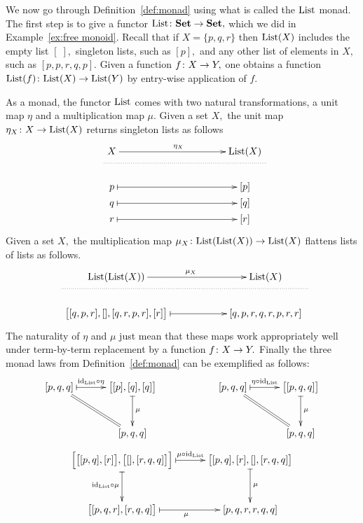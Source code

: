 \documentclass[CT4S-EN-RU]{subfiles}
\begin{document}
\begin{exampleENG}\label{ex:monad}
We now go through Definition~\ref{def:monad} using what is called the $\textnormal{List}$ monad. The first step is to give a functor $\textnormal{List}\colon{\mathbf{Set}}\rightarrow{\mathbf{Set}},$ which we did in Example~\ref{ex:free monoid}. Recall that if $X=\{p,q,r\}$ then $\textnormal{List}(X)$ includes the empty list $[\;],$ singleton lists, such as $[p],$ and any other list of elements in $X,$ such as $[p,p,r,q,p].$ Given a function $f\colon X\rightarrow Y,$ one obtains a function $\textnormal{List}(f)\colon\textnormal{List}(X)\rightarrow\textnormal{List}(Y)$ by entry-wise application of $f.$

As a monad, the functor $\textnormal{List}$ comes with two natural transformations, a unit map $\eta$ and a multiplication map $\mu.$ Given a set $X,$ the unit map $\eta_X\colon X\rightarrow\textnormal{List}(X)$ returns singleton lists as follows
$$\xymatrix@=.5pt{
&X\ar[rr]^{\eta_X}&\hspace{1.4in}&\List(X)\\
\ar@{..}[rrr]+<.3in,0pt>&&&\\\\\\
&p\ar@{|->}[rr]&&[p]\\
&q\ar@{|->}[rr]&&[q]\\
&r\ar@{|->}[rr]&&[r]}$$
Given a set $X,$ the multiplication map $\mu_X\colon\textnormal{List}(\textnormal{List}(X))\rightarrow\textnormal{List}(X)$ flattens lists of lists as follows.
$$\xymatrix@=.5pt{
&\List(\List(X))\ar[rr]^{\mu_X}&\hspace{.7in}&\List(X)\\
\ar@{..}[rrr]+<.6in,0pt>&&&\\\\\\
&\big[[q, p, r], [], [q, r, p, r], [r]\big]\ar@{|->}[rr]&&[q, p, r, q, r, p, r, r]}$$
The naturality of $\eta$ and $\mu$ just mean that these maps work appropriately well under term-by-term replacement by a function $f\colon X\rightarrow Y.$ Finally the three monad laws from Definition~\ref{def:monad} can be exemplified as follows:
$$\xymatrix@=30pt{[p, q, q]\ar@{|->}[r]^-{\id_\List\circ\eta}\ar@{=}[rd]&\big[[p], [q], [q]\big]\ar@{|->}[d]^\mu\\&[p, q, q]}\hspace{.8in}
\xymatrix@=30pt{[p, q, q]\ar@{|->}[r]^-{\eta\circ\id_\List}\ar@{=}[rd]&\big[[p, q, q]\big]\ar@{|->}[d]^\mu\\&[p,q,q]}$$
\vspace{.1in}
$$\xymatrix@=30pt{\Big[\big[[p, q], [r]\big], \big[[], [r, q, q]\big]\Big]\ar@{|->}[r]^-{\mu\circ\id_\List}\ar@{|->}[d]_{\id_\List\circ\mu}&\big[[p, q], [r], [], [r, q, q]\big]\ar@{|->}[d]^\mu\\\big[[p, q, r], [r, q, q]\big]\ar@{|->}[r]_\mu&[p, q, r, r, q,q]}$$
\end{exampleENG}
\end{document}
